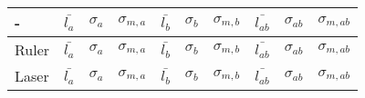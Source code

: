 \begin{tabular}{| l | l | l | l | l | l | l | l | l | l |}
\hline
    -  & $\bar{l_{a}}$ & $\sigma_a$ & $\sigma_{m, a}$ & $\bar{l_{b}}$ & $\sigma_b$ & $\sigma_{m, b}$ & $\bar{l_{ab}}$ & $\sigma_{ab}$ & $\sigma_{m, ab}$ \\ \hline

    Ruler  & $\bar{l_{a}}$ & $\sigma_a$ & $\sigma_{m, a}$ & $\bar{l_{b}}$ & $\sigma_b$ & $\sigma_{m, b}$ & $\bar{l_{ab}}$ & $\sigma_{ab}$ & $\sigma_{m, ab}$ \\ \hline

    Laser  & $\bar{l_{a}}$ & $\sigma_a$ & $\sigma_{m, a}$ & $\bar{l_{b}}$ & $\sigma_b$ & $\sigma_{m, b}$ & $\bar{l_{ab}}$ & $\sigma_{ab}$ & $\sigma_{m, ab}$ \\ \hline

\end{tabular}